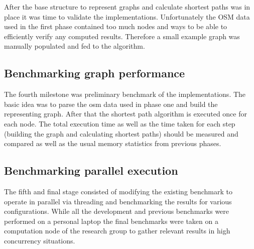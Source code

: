 After the base structure to represent graphs and calculate shortest paths was in place it was time to validate the implementations. Unfortunately the OSM data used in the first phase contained too much nodes and ways to be able to efficiently verify any computed results. Therefore a small example graph was manually populated and fed to the algorithm.

\subsection{Benchmarking graph performance}
\label{subsec:Approach::Implementation::SequentialBenchmark}

The fourth milestone was preliminary benchmark of the implementations. The basic idea was to parse the \gls{osm} data used in phase one and build the representing graph. After that the shortest path algorithm is executed once for each node. The total execution time as well as the time taken for each step (building the graph and calculating shortest paths) should be measured and compared as well as the usual memory statistics from previous phases.

\subsection{Benchmarking parallel execution}
\label{subsec:Approach::Implementation::ParallelBenchmark}

The fifth and final stage consisted of modifying the existing benchmark to operate in parallel via threading and benchmarking the results for various configurations. While all the development and previous benchmarks were performed on a personal laptop the final benchmarks were taken on a computation node of the research group to gather relevant results in high concurrency situations.
